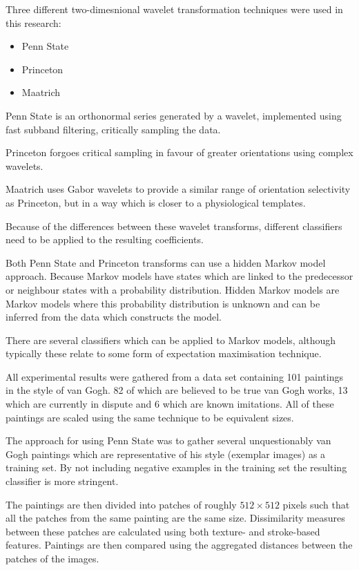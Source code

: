 \documentclass[conference]{IEEEtran}
\begin{document}
Three different two-dimesnional wavelet transformation techniques were used in
this research:

\begin{itemize}
\item Penn State
\item Princeton
\item Maatrich
\end{itemize}

Penn State is an orthonormal series generated by a wavelet, implemented using
fast subband filtering, critically sampling the data.

Princeton forgoes critical sampling in favour of greater orientations using
complex wavelets.

Maatrich uses Gabor wavelets to provide a similar range of orientation
selectivity as Princeton, but in a way which is closer to a physiological
templates.

Because of the differences between these wavelet transforms, different
classifiers need to be applied to the resulting coefficients.

Both Penn State and Princeton transforms can use a hidden Markov model
approach. Because Markov models have states which are linked to the predecessor
or neighbour states with a probability distribution. Hidden Markov models are
Markov models where this probability distribution is unknown and can be
inferred from the data which constructs the model.

There are several classifiers which can be applied to Markov models, although
typically these relate to some form of expectation maximisation technique.

All experimental results were gathered from a data set containing 101 paintings
in the style of van Gogh. 82 of which are believed to be true van Gogh works,
13 which are currently in dispute and 6 which are known imitations. All of
these paintings are scaled using the same technique to be equivalent sizes.

The approach for using Penn State was to gather several unquestionably van Gogh
paintings which are representative of his style (exemplar images) as a training
set. By not including negative examples in the training set the resulting
classifier is more stringent.

The paintings are then divided into patches of roughly $512 \times 512$ pixels
such that all the patches from the same painting are the same size.
Dissimilarity measures between these patches are calculated using both texture-
and stroke-based features. Paintings are then compared using the aggregated
distances between the patches of the images.
\end{document}
